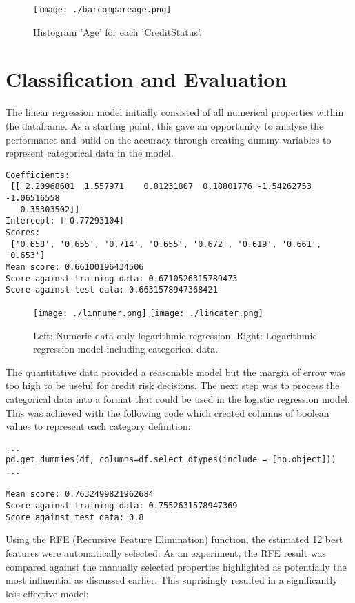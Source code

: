 \documentclass[a4paper]{article}
\begin{document}
\begin{figure}[H]
\texttt{[image: ./barcompareage.png]}
\caption{Histogram 'Age' for each 'CreditStatus'.}
\end{figure}

\section{Classification and Evaluation}

The linear regression model initially consisted of all numerical properties within the dataframe.  As a starting point, this gave an opportunity to analyse the performance and build on the accuracy through creating dummy variables to represent categorical data in the model.
\newpage
\begin{lstlisting}
Coefficients:
 [[ 2.20968601  1.557971    0.81231807  0.18801776 -1.54262753 -1.06516558
   0.35303502]]
Intercept: [-0.77293104]
Scores:
 ['0.658', '0.655', '0.714', '0.655', '0.672', '0.619', '0.661', '0.653']
Mean score: 0.66100196434506
Score against training data: 0.6710526315789473
Score against test data: 0.6631578947368421
\end{lstlisting}

\begin{figure}[H]
\begin{center}
\texttt{[image: ./linnumer.png]}
\texttt{[image: ./lincater.png]}
\end{center}
\caption{Left: Numeric data only logarithmic regression. Right: Logarithmic regression model including categorical data.}
\end{figure} 

The quantitative data provided a reasonable model but the margin of errow was too high to be useful for credit risk decisions.  The next step was to process the categorical data into a format that could be used in the logistic regression model.  This was achieved with the following code which created columns of boolean values to represent each category definition:
\begin{lstlisting}
...
pd.get_dummies(df, columns=df.select_dtypes(include = [np.object]))
...

Mean score: 0.7632499821962684
Score against training data: 0.7552631578947369
Score against test data: 0.8
\end{lstlisting}

Using the RFE (Recursive Feature Elimination) function, the estimated 12 best features were automatically selected. As an experiment, the RFE result was compared against the manually selected properties highlighted as potentially the most influential as discussed earlier. This suprisingly resulted in a significantly less effective model:
\end{document}
